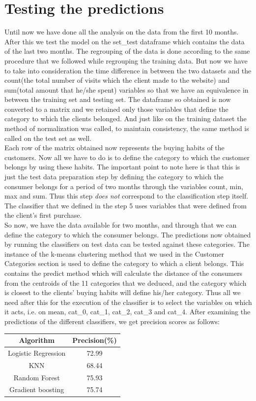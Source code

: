 \section{Testing the predictions}
Until now we have done all the analysis on the data from the first 10 months. After this we test the model on the set\_test dataframe which contains the data of the last two months. The regrouping of the data is done according to the same procedure that we followed while regrouping the training data. But now we have to take into consideration the time difference in between the two datasets and the count(the total number of visits which the client made to the website) and sum(total amount that he/she spent) variables so that we have an equivalence in between the training set and testing set. The dataframe so obtained is now converted to a matrix and we retained only those variables that define the category to which the clients belonged. And just like on the training dataset the method of normalization was called, to maintain consistency, the same method is called on the test set as well.\\
Each row of the matrix obtained now represents the buying habits of the customers. Now all we have to do is to define the category to which the customer belongs by using these habits. The important point to note here is that this is just the test data preparation step by defining the category to which the consumer belongs for a period of two months through the variables count, min, max and sum. Thus this step \emph{does not} correspond to the classification step itself. The classifier that we defined in the step 5 uses variables that were defined from the client's first purchase.\\
So now, we have the data available for two months, and through that we can define the category to which the consumer belongs. The predictions now obtained by running the classifiers on test data can be tested against these categories. The instance of the k-means clustering method that we used in the Customer Categories section is used to define the category to which a client belongs. This contains the predict method which will calculate the distance of the consumers from the centroids of the 11 categories that we deduced, and the category which is closest to the clients' buying habits will define his/her category. Thus all we need after this for the execution of the classifier is to select the variables on which it acts, i.e. on mean, cat\_0, cat\_1, cat\_2, cat\_3 and cat\_4. After examining the predictions of the different classifiers, we get precision scores as follows:\\ 
\begin{center}
 \begin{tabular}{|c | c|} 
 \hline
 Algorithm & Precision(\%) \\ [0.5ex] 
 \hline
 Logistic Regression & 72.99\\ 
 \hline
 KNN & 68.44 \\
 \hline
 Random Forest & 75.93 \\
 \hline
 Gradient boosting & 75.74 \\
 \hline
 
\end{tabular}
\end{center}

